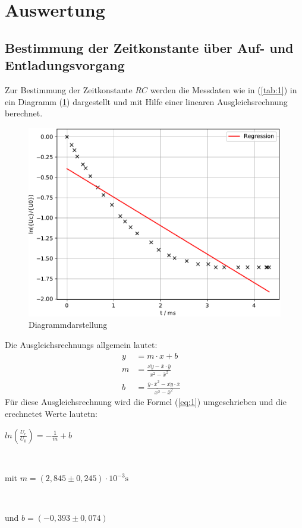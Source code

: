 

\section{Auswertung}
\subsection{Bestimmung der Zeitkonstante über Auf- und Entladungsvorgang}
Zur Bestimmung der Zeitkonstante $RC$ werden die Messdaten wie in (\ref{tab:1})
in ein Diagramm (\ref{fig:1}) dargestellt und mit Hilfe einer linearen Ausgleichsrechnung
berechnet.

\begin{figure}[H]
  \centering
  \includegraphics[width=\textwidth]{Diagramm1.pdf}
  \caption{Diagrammdarstellung}
  \label{fig:1}
\end{figure}
Die Ausgleichsrechnungs allgemein lautet:
\begin{align}
  y & = m \cdot x + b \label{eq:1}\\
  m & = \frac {\bar{xy} - \bar{x} \cdot \bar{y}} {\bar{x^2} -\bar{x}^2}&  \label{eq:2}\\
  b & = \frac {\bar{y} \cdot \bar{x}^2 - \bar{xy} \cdot \bar{x}} {\bar{x^2}-\bar{x}^2}& \label{eq:3}
\end{align}
Für diese Ausgleichsrechnung wird die Formel (\ref{eq:1}) umgeschrieben und die erechnetet Werte lautetn: \\
\newline
\centerline{$ln(\frac{U_\text{c}}{U_\text{0}}) = -\frac{1}{m} + b$}\\
\centerline{mit $m = (2,845 \pm 0,245) \cdot 10^{-3} \si{\second}$}\\
\centerline{und $b = (-0,393 \pm 0,074)$}
\newline

